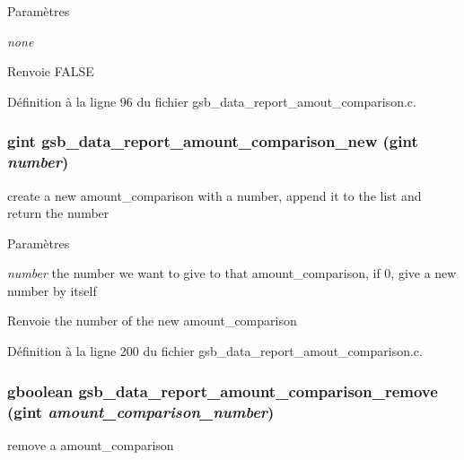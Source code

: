 \begin{DoxyParams}{Paramètres}
\item[{\em none}]\end{DoxyParams}
\begin{DoxyReturn}{Renvoie}
FALSE 
\end{DoxyReturn}


Définition à la ligne 96 du fichier gsb\_\-data\_\-report\_\-amout\_\-comparison.c.

\subsubsection[{gsb\_\-data\_\-report\_\-amount\_\-comparison\_\-new}]{\setlength{\rightskip}{0pt plus 5cm}gint gsb\_\-data\_\-report\_\-amount\_\-comparison\_\-new (gint {\em number})}\label{gsb__data__report__amout__comparison_8c_a68750f00e0800724678fadc6245433eb}
create a new amount\_\-comparison with a number, append it to the list and return the number


\begin{DoxyParams}{Paramètres}
\item[{\em number}]the number we want to give to that amount\_\-comparison, if 0, give a new number by itself\end{DoxyParams}
\begin{DoxyReturn}{Renvoie}
the number of the new amount\_\-comparison 
\end{DoxyReturn}


Définition à la ligne 200 du fichier gsb\_\-data\_\-report\_\-amout\_\-comparison.c.

\subsubsection[{gsb\_\-data\_\-report\_\-amount\_\-comparison\_\-remove}]{\setlength{\rightskip}{0pt plus 5cm}gboolean gsb\_\-data\_\-report\_\-amount\_\-comparison\_\-remove (gint {\em amount\_\-comparison\_\-number})}\label{gsb__data__report__amout__comparison_8c_a619ca7f05d61b5181fdf004d786d73c2}
remove a amount\_\-comparison


